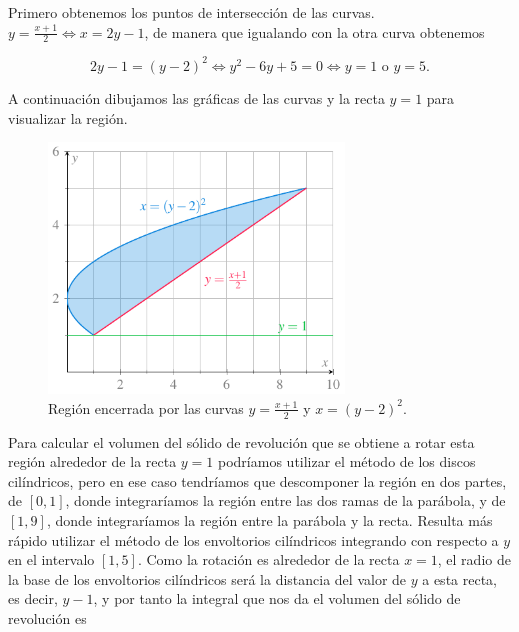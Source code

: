 \documentclass[
  a4paper,
]{scrreport}
\theoremstyle{definition}
\theoremstyle{remark}
\begin{document}
\begin{tcolorbox}[enhanced jigsaw, rightrule=.15mm, coltitle=black, colframe=quarto-callout-tip-color-frame, opacitybacktitle=0.6, bottomrule=.15mm, title=\textcolor{quarto-callout-tip-color}{\faLightbulb}\hspace{0.5em}{Solución}, opacityback=0, leftrule=.75mm, titlerule=0mm, colbacktitle=quarto-callout-tip-color!10!white, breakable, toprule=.15mm, left=2mm, colback=white, toptitle=1mm, arc=.35mm, bottomtitle=1mm]

Primero obtenemos los puntos de intersección de las curvas.
\(y=\frac{x+1}{2} \Leftrightarrow x = 2y-1\), de manera que igualando
con la otra curva obtenemos

\[
2y-1 = (y-2)^2 \Leftrightarrow y^2 - 6y + 5 = 0 \Leftrightarrow y = 1 \mbox{ o } y = 5.
\]

A continuación dibujamos las gráficas de las curvas y la recta \(y=1\)
para visualizar la región.

\begin{figure}[H]

{\centering \includegraphics[width=0.7\textwidth,height=\textheight]{img/examen-2024-04-16/region-solido-revolucion-int-10-gen.pdf}

}

\caption{Región encerrada por las curvas \(y=\frac{x+1}{2}\) y
\(x=(y-2)^2\).}

\end{figure}%

Para calcular el volumen del sólido de revolución que se obtiene a rotar
esta región alrededor de la recta \(y=1\) podríamos utilizar el método
de los discos cilíndricos, pero en ese caso tendríamos que descomponer
la región en dos partes, de \([0, 1]\), donde integraríamos la región
entre las dos ramas de la parábola, y de \([1, 9]\), donde integraríamos
la región entre la parábola y la recta. Resulta más rápido utilizar el
método de los envoltorios cilíndricos integrando con respecto a \(y\) en
el intervalo \([1, 5]\). Como la rotación es alrededor de la recta
\(x=1\), el radio de la base de los envoltorios cilíndricos será la
distancia del valor de \(y\) a esta recta, es decir, \(y-1\), y por
tanto la integral que nos da el volumen del sólido de revolución es


\end{tcolorbox}
\end{document}
